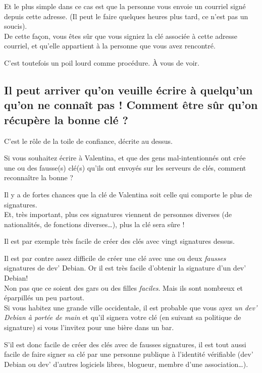 Et le plus simple dans ce cas est que la personne vous envoie un
courriel signé depuis cette adresse. (Il peut le faire quelques heures
plus tard, ce n'est pas un soucis).\\De cette façon, vous êtes sûr que
vous signiez la clé associée à cette adresse courriel, et qu'elle
appartient à la personne que vous avez rencontré.

C'est toutefois un poil lourd comme procédure. À vous de voir.

\subsection{Il peut arriver qu'on veuille écrire à quelqu'un qu'on ne
connaît pas ! Comment être sûr qu'on récupère la bonne clé
?}\label{il-peut-arriver-quon-veuille-uxe9crire-uxe0-quelquun-quon-ne-connauxeet-pas-comment-uxeatre-suxfbr-quon-ruxe9cupuxe8re-la-bonne-cluxe9}

C'est le rôle de la toile de confiance, décrite au dessus.

Si vous souhaitez écrire à Valentina, et que des gens mal-intentionnés
ont crée une ou des fausse(s) clé(s) qu'ils ont envoyés sur les serveurs
de clés, comment reconnaître la bonne ?

Il y a de fortes chances que la clé de Valentina soit celle qui comporte
le plus de signatures.\\Et, très important, plus ces signatures viennent
de personnes diverses (de nationalités, de fonctions diverses\ldots{}),
plus la clé sera sûre !

Il est par exemple très facile de créer des clés avec vingt signatures
dessus.

Il est par contre assez difficile de créer une clé avec une ou deux
\emph{fausses} signatures de dev' Debian. Or il est très facile
d'obtenir la signature d'un dev' Debian!\\Non pas que ce soient des gars
ou des filles \emph{faciles}. Mais ils sont nombreux et éparpillés un
peu partout.\\Si vous habitez une grande ville occidentale, il est
probable que vous ayez \emph{un dev' Debian à portée de main} et qu'il
signera votre clé (en suivant sa politique de signature) si vous
l'invitez pour une bière dans un bar.

S'il est donc facile de créer des clés avec de fausses signatures, il
est tout aussi facile de faire signer sa clé par une personne publique à
l'identité vérifiable (dev' Debian ou dev' d'autres logiciels libres,
blogueur, membre d'une association\ldots{}).

